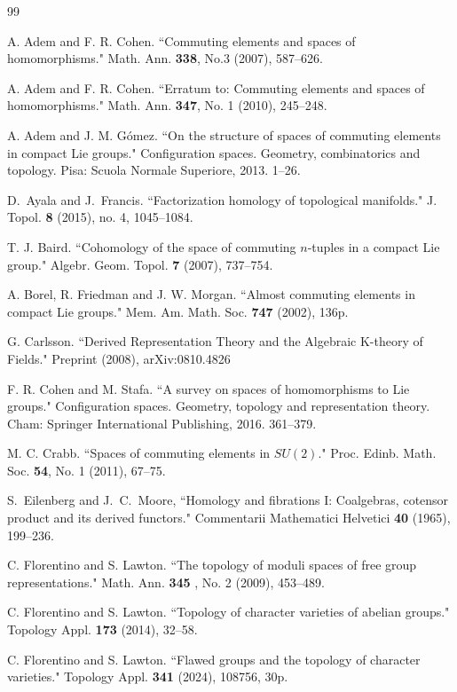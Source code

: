\documentclass[oneside, a4paper, 12pt]{article}
\numberwithin{equation}{section}
\theoremstyle{plain}
\theoremstyle{definition}
\theoremstyle{remark}
\begin{document}
\begin{thebibliography}{99}

 A. Adem and F. R. Cohen. ``Commuting elements and spaces of homomorphisms." Math. Ann. {\bf 338}, No.3 (2007), 587--626.

 A. Adem and F. R. Cohen. ``Erratum to: Commuting elements and spaces of homomorphisms." Math. Ann. {\bf 347}, No. 1 (2010), 245--248.

 A. Adem and J. M. Gómez. ``On the structure of spaces of commuting elements in compact Lie groups." Configuration spaces. Geometry, combinatorics and topology. Pisa: Scuola Normale Superiore, 2013. 1--26.

 D.~Ayala and J.~Francis. ``Factorization homology of topological manifolds." J. Topol. {\bf 8} (2015), no. 4, 1045--1084.

 T. J. Baird. ``Cohomology of the space of commuting $n$-tuples in a compact Lie group." Algebr. Geom. Topol. {\bf 7} (2007), 737--754.

 A. Borel, R. Friedman and J. W. Morgan. ``Almost commuting elements in compact Lie groups." Mem. Am. Math. Soc. {\bf 747} (2002), 136p.

 G. Carlsson. ``Derived Representation Theory and the Algebraic K-theory of Fields." Preprint (2008), arXiv:0810.4826

 F. R. Cohen and M. Stafa. ``A survey on spaces of homomorphisms to Lie groups." Configuration spaces. Geometry, topology and representation theory. Cham: Springer International Publishing, 2016. 361--379.

 M. C. Crabb. ``Spaces of commuting elements in $SU(2)$." Proc. Edinb. Math. Soc.  {\bf 54}, No. 1 (2011), 67--75.

 S.~Eilenberg and J.~C.~Moore, ``Homology and fibrations I: Coalgebras, cotensor product and its derived functors." Commentarii Mathematici Helvetici \textbf{ 40} (1965), 199--236.

 C. Florentino and S. Lawton. ``The topology of moduli spaces of free group representations." Math. Ann. {\bf 345} , No. 2 (2009), 453--489.

 C. Florentino and S. Lawton. ``Topology of character varieties of abelian groups." Topology Appl. {\bf 173} (2014), 32--58.

 C. Florentino and S. Lawton. ``Flawed groups and the topology of character varieties." Topology Appl. {\bf 341} (2024), 108756, 30p.


\end{thebibliography}
\end{document}
